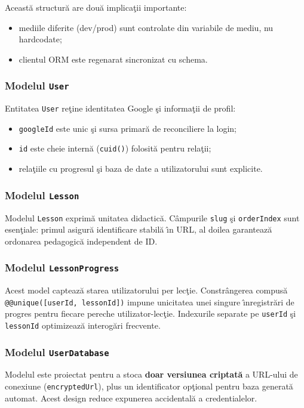 \documentclass[12pt,onecolumn,draftclsnofoot]{IEEEtran}
\begin{document}
Aceast\u{a} structur\u{a} are dou\u{a} implica\c{t}ii importante:
\begin{itemize}
  \item mediile diferite (dev/prod) sunt controlate din variabile de mediu, nu hardcodate;
  \item clientul ORM este regenarat sincronizat cu schema.
\end{itemize}

\subsubsection{Modelul \texttt{User}}
Entitatea \texttt{User} re\c{t}ine identitatea Google \c{s}i informa\c{t}ii de profil:
\begin{itemize}
  \item \texttt{googleId} este unic \c{s}i sursa primar\u{a} de reconciliere la login;
  \item \texttt{id} este cheie intern\u{a} (\texttt{cuid()}) folosit\u{a} pentru rela\c{t}ii;
  \item rela\c{t}iile cu progresul \c{s}i baza de date a utilizatorului sunt explicite.
\end{itemize}

\subsubsection{Modelul \texttt{Lesson}}
Modelul \texttt{Lesson} exprim\u{a} unitatea didactic\u{a}. C\^{a}mpurile \texttt{slug} \c{s}i \texttt{orderIndex} sunt esen\c{t}iale: primul asigur\u{a} identificare stabil\u{a} \^{\i}n URL, al doilea garanteaz\u{a} ordonarea pedagogic\u{a} independent de ID.

\subsubsection{Modelul \texttt{LessonProgress}}
Acest model capteaz\u{a} starea utilizatorului per lec\c{t}ie. Constr\^{a}ngerea compus\u{a}
\texttt{@@unique([userId, lessonId])} impune unicitatea unei singure \^{\i}nregistr\u{a}ri de progres pentru fiecare pereche utilizator-lec\c{t}ie. Indexurile separate pe \texttt{userId} \c{s}i \texttt{lessonId} optimizeaz\u{a} interog\u{a}ri frecvente.

\subsubsection{Modelul \texttt{UserDatabase}}
Modelul este proiectat pentru a stoca \textbf{doar versiunea criptat\u{a}} a URL-ului de conexiune (\texttt{encryptedUrl}), plus un identificator op\c{t}ional pentru baza generat\u{a} automat. Acest design reduce expunerea accidental\u{a} a credentialelor.
\end{document}

